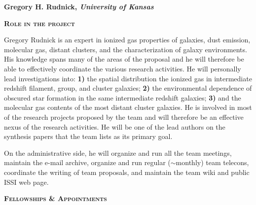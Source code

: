 \documentclass[11pt]{article}
\begin{document}
\renewcommand{\thepage}{}

\begin{center}
{\LARGE \bf Gregory H. Rudnick, {\it University of Kansas}}
\end{center}
\vspace{1.0mm}

\begin{flushleft}
{\large {\bf \textsc{Role in the project}}
\hrulefill} \\
\end{flushleft}

Gregory Rudnick is an expert in ionized gas properties of galaxies, dust emission, molecular gas, distant clusters, and the characterization of galaxy environments.  His knowledge spans many of the areas of the proposal and he will therefore be able to effectively coordinate the various research activities.  He will personally lead investigations into: \textbf{1)} the spatial distribution the ionized gas in intermediate redshift filament, group, and cluster galaxies; \textbf{2)} the environmental dependence of obscured star formation in the same intermediate redshift galaxies; \textbf{3)} and the molecular gas contents of the most distant cluster galaxies.  He is involved in most of the research projects proposed by the team and will therefore be an effective nexus of the research activities.  He will be one of the lead authors on the synthesis papers that the team lists as its primary goal.

On the administrative side, he will organize and run all the team meetings, maintain the e-mail archive, organize and run regular ($\sim$monthly) team telecons, coordinate the writing of team proposals, and maintain the team wiki and public ISSI web page.

\begin{flushleft}
{\large {\bf \textsc{Fellowships \& Appointments}}
\hrulefill}
\end{flushleft}
\end{document}
